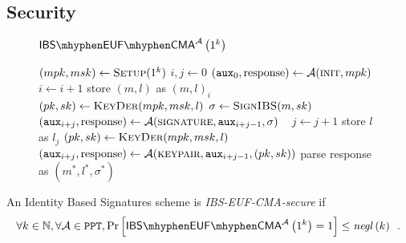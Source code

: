   \subsection{Security}
    \begin{figure}[H]
      \begin{gamebox}{$\mathsf{IBS \mhyphen EUF \mhyphen
      CMA}^{\adversary}\left(1^k\right)$}
        \begin{algorithmic}[1]
          \State $(mpk, msk) \gets \textsc{Setup}(1^k)$
          \State $i, j \gets 0$
          \State $(\mathtt{aux}_0, \mathrm{response}) \gets
          \mathcal{A}(\textsc{init}, mpk)$
              \State $i \gets i + 1$
              \State store $(m, l)$ as $(m, l)_i$
              \State $(pk, sk) \gets \textsc{KeyDer}(mpk, msk, l)$
              \State $\sigma \gets \textsc{SignIBS}(m, sk)$
              \State $(\mathtt{aux}_{i+j}, \mathrm{response}) \gets
              \mathcal{A}(\textsc{signature}, \mathtt{aux}_{i+j-1}, \sigma)$
            \Else \ 
              \State $j \gets j + 1$
              \State store $l$ as $l_j$
              \State $(pk, sk) \gets \textsc{KeyDer}(mpk, msk, l)$
              \State $(\mathtt{aux}_{i+j}, \mathrm{response}) \gets
              \mathcal{A}(\textsc{keypair}, \mathtt{aux}_{i+j-1}, (pk, sk))$
            \EndIf
          \EndWhile
          \State parse response as $(m^*, l^*, \sigma^*)$
            \State {}
          \Else
            \State {}
          \EndIf
        \end{algorithmic}
      \end{gamebox}
      \caption{}
      \label{game:ibs}
    \end{figure}
    \begin{definition}
      \label{def:ibs:secure}
      An Identity Based Signatures scheme is \emph{\textsf{IBS-EUF-CMA}-secure}
      if
      \begin{equation*}
        \forall k \in \mathbb{N}, \forall \adversary \in \mathtt{PPT},
        \Pr\left[\mathsf{IBS \mhyphen EUF \mhyphen
        CMA}^{\adversary}\left(1^k\right) = 1\right] \leq
        \mathit{negl}\left(k\right) \enspace.
      \end{equation*}
    \end{definition}

